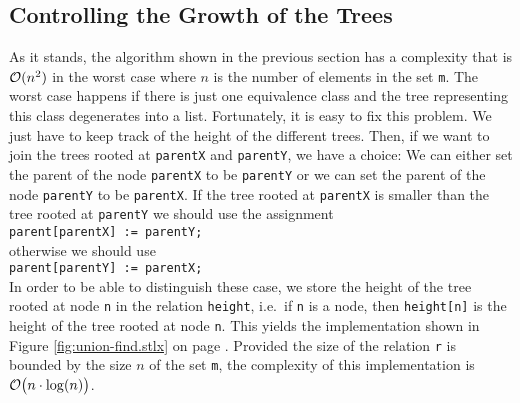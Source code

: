 \subsection{Controlling the Growth of the Trees}
As it stands, the algorithm shown in the previous section has a complexity that is $\mathcal{O}(n^2)$ in the
worst case where $n$ is the number of elements in the set \texttt{m}.  The worst case happens if there
is just one equivalence class and the tree representing this class degenerates into a list.
Fortunately, it is easy to fix this problem.  We just have to keep track of the height of the
different trees.  Then, if we want to join the trees rooted at \texttt{parentX} and
\texttt{parentY}, we have a choice: We can either set the parent of the node \texttt{parentX} to
be \texttt{parentY} or we can set the parent of the node \texttt{parentY} to be \texttt{parentX}.
If the tree rooted at \texttt{parentX} is smaller than the tree rooted at \texttt{parentY} we should
use the assignment
\\[0.2cm]
\hspace*{1.3cm}
\texttt{parent[parentX] := parentY;}
\\[0.2cm]
otherwise we should use
\\[0.2cm]
\hspace*{1.3cm}
\texttt{parent[parentY] := parentX;}
\\[0.2cm]
In order to be able to distinguish these case, we store the height of the tree rooted at node
\texttt{n} in the relation \texttt{height}, i.e.~if \texttt{n} is a node, then \texttt{height[n]} is
the height of the tree rooted at node \texttt{n}.  This yields the implementation shown in Figure
\ref{fig:union-find.stlx} on page \pageref{fig:union-find.stlx}.  Provided the size  of the relation
\texttt{r} is bounded by the size $n$ of the set \texttt{m}, the complexity of this
implementation is $\mathcal{O}\bigl(n \cdot \log(n)\bigr)$.


